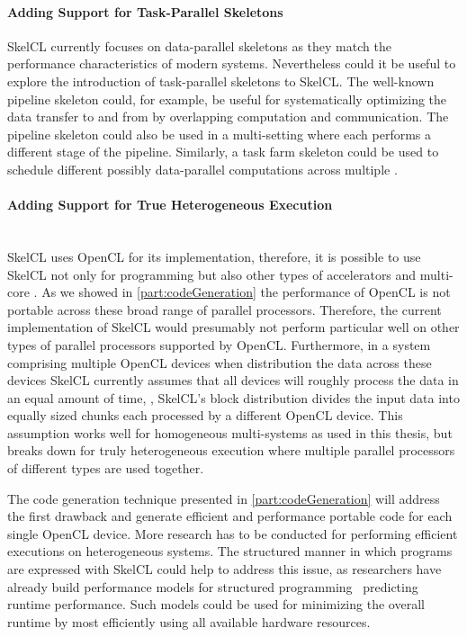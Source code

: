 \paragraph{Adding Support for Task-Parallel Skeletons}
SkelCL currently focuses on data-parallel skeletons as they match the performance characteristics of modern \GPU systems.
Nevertheless could it be useful to explore the introduction of task-parallel skeletons to SkelCL.
The well-known pipeline skeleton could, for example, be useful for systematically optimizing the data transfer to and from \GPUs by overlapping computation and communication.
The pipeline skeleton could also be used in a multi-\GPU setting where each \GPUs performs a different stage of the pipeline.
Similarly, a task farm skeleton could be used to schedule different possibly data-parallel computations across multiple \GPUs.

\paragraph{Adding Support for True Heterogeneous Execution}\hfill\\
SkelCL uses OpenCL for its implementation, therefore, it is possible to use SkelCL not only for programming \GPUs but also other types of accelerators and multi-core \CPUs.
As we showed in \autoref{part:codeGeneration} the performance of OpenCL is not portable across these broad range of parallel processors.
Therefore, the current implementation of SkelCL would presumably not perform particular well on other types of parallel processors supported by OpenCL.
Furthermore, in a system comprising multiple OpenCL devices when distribution the data across these devices SkelCL currently assumes that all devices will roughly process the data in an equal amount of time, \ie, SkelCL's block distribution divides the input data into equally sized chunks each processed by a different OpenCL device.
This assumption works well for homogeneous multi-\GPU systems as used in this thesis, but breaks down for truly heterogeneous execution where multiple parallel processors of different types are used together.

The code generation technique presented in \autoref{part:codeGeneration} will address the first drawback and generate efficient and performance portable code for each single OpenCL device.
More research has to be conducted for performing efficient executions on heterogeneous systems.
The structured manner in which programs are expressed with SkelCL could help to address this issue, as researchers have already build performance models for structured programming~\cite{BischofGK03,Alt2007,DarlingtonFHKSW93,StegmeierFrJAUn2015} predicting runtime performance.
Such models could be used for minimizing the overall runtime by most efficiently using all available hardware resources.


